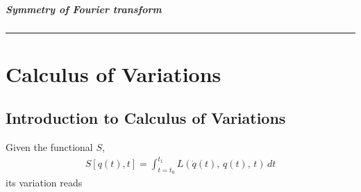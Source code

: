 \documentclass[letterpaper,10pt,english]{jupyterBook}
\begin{document}
\subsubsection{Symmetry of Fourier transform}
\label{\detokenize{ch/complex/fourier-transforms:symmetry-of-fourier-transform}}\label{\detokenize{ch/complex/fourier-transforms:complex-fourier-useful-properties-symmetry}}

\bigskip\hrule\bigskip


\sphinxstepscope


\part{Calculus of Variations}

\sphinxstepscope


\chapter{Introduction to Calculus of Variations}
\label{\detokenize{ch/calculus-variations/intro:introduction-to-calculus-of-variations}}\label{\detokenize{ch/calculus-variations/intro:calculus-variations-intro}}\label{\detokenize{ch/calculus-variations/intro::doc}}
\sphinxAtStartPar
Given the functional \(S\),
\begin{equation*}
\begin{split}S[q(t),t] = \int_{t=t_0}^{t_1} L(\dot{q}(t), \, q(t), \, t) \, dt\end{split}
\end{equation*}
\sphinxAtStartPar
its variation reads
\end{document}
